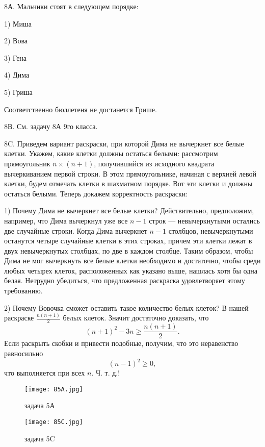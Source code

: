 \documentclass[12pt]{amsart}
\theoremstyle{definition}
\theoremstyle{remark}
\theoremstyle{plain}
\begin{document}
8А. Мальчики стоят в следующем порядке:

1) Миша

2) Вова

3) Гена

4) Дима

5) Гриша

Соответственно бюллетеня не достанется Грише.

8В. См. задачу 8А 9го класса.

8C. Приведем вариант раскраски, при которой Дима не вычеркнет все белые клетки. Укажем, какие клетки должны остаться белыми: рассмотрим прямоугольник $n\times (n+1)$, получившийся из исходного квадрата вычеркиванием первой строки. В этом прямоугольнике, начиная с верхней левой клетки, будем отмечать клетки в шахматном порядке. Вот эти клетки и должны остаться белыми. Теперь докажем корректность раскраски:

1) Почему Дима не вычеркнет все белые клетки? Действительно, предположим, например, что Дима вычеркнул уже все $n-1$ строк --- невычеркнутыми остались две случайные строки. Когда Дима вычеркнет $n-1$ столбцов, невычеркнутыми останутся четыре случайные клетки в этих строках, причем эти клетки лежат в двух невычеркнутых столбцах, по две в каждом столбце. Таким образом, чтобы Дима не мог вычеркнуть все белые клетки необходимо и достаточно, чтобы среди любых четырех клеток, расположенных как указано выше, нашлась хотя бы одна белая. Нетрудно убедиться, что предложенная раскраска удовлетворяет этому требованию.

2) Почему Вовочка сможет оставить такое количество белых клеток? В нашей раскраске $\frac{n(n+1)}{2}$ белых клеток. Значит достаточно доказать, что
$$
(n+1)^2-3n\geq \frac{n(n+1)}{2}.
$$
Если раскрыть скобки и привести подобные, получим, что это неравенство равносильно
$$
(n-1)^2\geq 0,
$$
что выполняется при всех $n$. Ч. т. д.!


\begin{figure}[h]
\begin{center}
\texttt{[image: 85A.jpg]}
\end{center}
\caption{задача 5А}
\end{figure}


\begin{figure}[h]
\begin{center}
\texttt{[image: 85C.jpg]}
\end{center}
\caption{задача 5C}
\end{figure}
\end{document}
